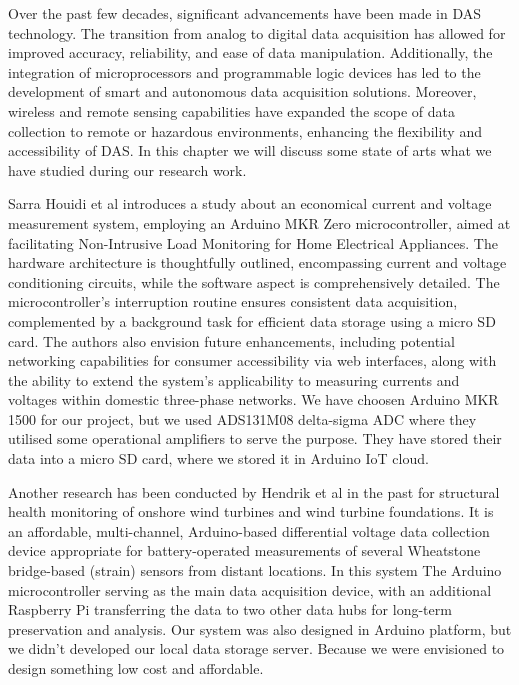Over the past few decades, significant advancements have been made in DAS technology. The transition from analog to digital data acquisition has allowed for improved accuracy, reliability, and ease of data manipulation. Additionally, the integration of microprocessors and programmable logic devices has led to the development of smart and autonomous data acquisition solutions. Moreover, wireless and remote sensing capabilities have expanded the scope of data collection to remote or hazardous environments, enhancing the flexibility and accessibility of DAS. In this chapter we will discuss some state of arts what we have studied during our research work.
\vspace{0.5cm}\par
Sarra Houidi et al \textbf{\cite{Load_Monitoring}} introduces a study about an economical current and voltage measurement system, employing an Arduino MKR Zero microcontroller, aimed at facilitating Non-Intrusive Load Monitoring for Home Electrical Appliances. The hardware architecture is thoughtfully outlined, encompassing current and voltage conditioning circuits, while the software aspect is comprehensively detailed. The microcontroller's interruption routine ensures consistent data acquisition, complemented by a background task for efficient data storage using a micro SD card. The authors also envision future enhancements, including potential networking capabilities for consumer accessibility via web interfaces, along with the ability to extend the system's applicability to measuring currents and voltages within domestic three-phase networks. We have choosen Arduino MKR 1500 for our project, but we used ADS131M08 delta-sigma ADC where they utilised some operational amplifiers to serve the purpose. They have stored their data into a micro SD card, where we stored it in Arduino IoT cloud.

\vspace{0.5cm}
Another research has been conducted by Hendrik et al \textbf{\cite{MADV-DAQ}} in the past for structural health monitoring of onshore wind turbines and wind turbine foundations. It is an affordable, multi-channel, Arduino-based differential voltage data collection device appropriate for battery-operated measurements of several Wheatstone bridge-based (strain) sensors from distant locations. In this system The Arduino microcontroller serving as the main data acquisition device, with an additional Raspberry Pi transferring the data to two other data hubs for long-term preservation and analysis. Our system was also designed in Arduino platform, but we didn't developed our local data storage server. Because we were envisioned to design something low cost and affordable. 
\vspace{0.5cm}

